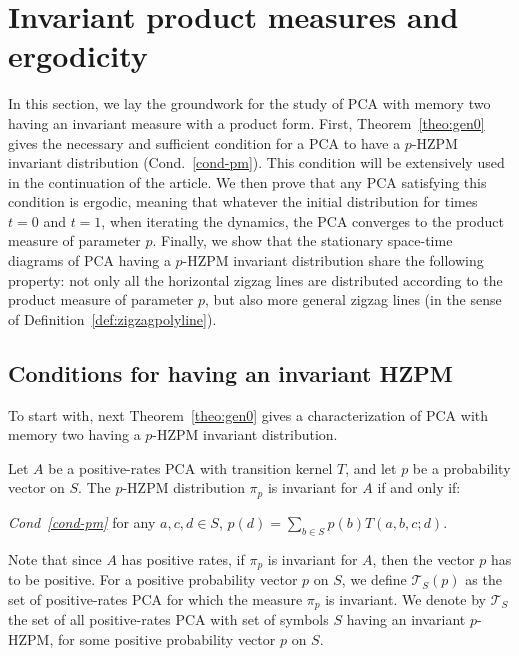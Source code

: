 \documentclass[AHL,Unicode,longabstracts]{cedram}
\newcounter{a}
\newcommand{\Cond}{Cond.}
\newenvironment{conddd}[1]{{\upshape\emph{Cond~\ref{#1}}\pointir}}{}
\newcommand{\triang}[2]{\mathcal{T}_{#1} \left(#2 \right)}
\newcommand{\triangE}[1]{\mathcal{T}_{#1}}
\begin{document}
\section{Invariant product measures and ergodicity}\label{sec:cond_ergo}

In this section, we lay the groundwork for the study of PCA with memory two having an invariant measure with a product form. First, Theorem~\ref{theo:gen0} gives the necessary and sufficient condition for a PCA to have a $p$-HZPM invariant distribution (\Cond~\ref{cond-pm}). This condition will be extensively used in the continuation of the article. We then prove that any PCA satisfying this condition is ergodic, meaning that whatever the initial distribution for times $t=0$ and $t=1$, when iterating the dynamics, the PCA converges to the product measure of parameter $p$. Finally, we show that the stationary space-time diagrams of PCA having a $p$-HZPM invariant distribution share the following property: not only all the horizontal zigzag lines are distributed according to the product measure of parameter $p$, but also more general zigzag lines (in the sense of Definition~\ref{def:zigzagpolyline}).

\subsection{Conditions for having an invariant HZPM}

To start with, next Theorem~\ref{theo:gen0} gives a characterization of PCA with memory two having a $p$-HZPM invariant distribution.

\begin{theo}\label{theo:gen0}
Let $A$ be a positive-rates PCA with transition kernel $T$, and let $p$ be a probability vector on $S$. The $p$-HZPM distribution $\pi_p$ is invariant for $A$ if and only if:

\textnormal{\begin{conddd}{cond-pm}
for any $a,c,d\in S$, $p(d) = \sum_{b \in S} p(b) T(a,b,c;d)$.
\end{conddd}}
\end{theo}

Note that since $A$ has positive rates, if $\pi_p$ is invariant for $A$, then the vector $p$ has to be positive. For a positive probability vector $p$ on $S$, we define $\triang{S}{p}$ as the set of positive-rates PCA for which the measure $\pi_p$ is invariant. We denote by $\triangE{S}$ the set of all positive-rates PCA with set of symbols $S$ having an invariant $p$-HZPM, for some positive probability vector $p$ on $S$.
\end{document}
